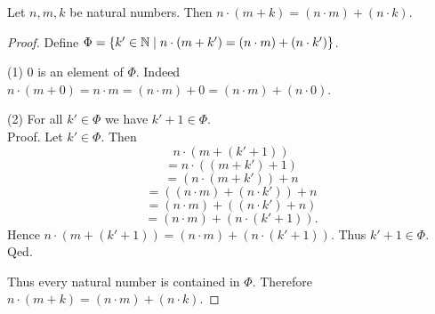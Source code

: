 \documentclass[10pt]{article}
\begin{document}
  \begin{forthel}
    \begin{proposition}[id=ARITHMETIC_06_9001524774567936,printid]
      Let $n, m, k$ be natural numbers.
      Then $n \cdot (m + k) = (n \cdot m) + (n \cdot k)$.
    \end{proposition}
    \begin{proof}
      Define $\Phi = \{ k' \in \mathbb{N} \mid n \cdot (m + k') = (n \cdot m) + (n \cdot k') \}$.

      (1) $0$ is an element of $\Phi$.
      Indeed $n \cdot (m + 0)
        = n \cdot m
        = (n \cdot m) + 0
        = (n \cdot m) + (n \cdot 0)$.

      (2) For all $k' \in \Phi$ we have $k' + 1 \in \Phi$. \\
      Proof.
        Let $k'\in \Phi$.
        Then
        \[  n \cdot (m + (k' + 1))                  \]
        \[    = n \cdot ((m + k') + 1)              \]
        \[    = (n \cdot (m + k')) + n              \]
        \[    = ((n \cdot m) + (n \cdot k')) + n    \]
        \[    = (n \cdot m) + ((n \cdot k') + n)    \]
        \[    = (n \cdot m) + (n \cdot (k' + 1)).   \]
        Hence $n \cdot (m + (k' + 1)) = (n \cdot m) + (n \cdot (k' + 1))$.
        Thus $k' + 1 \in \Phi$.
      Qed.

      Thus every natural number is contained in $\Phi$.
      Therefore $n \cdot (m + k) = (n \cdot m) + (n \cdot k)$.
    \end{proof}
  \end{forthel}
\end{document}
